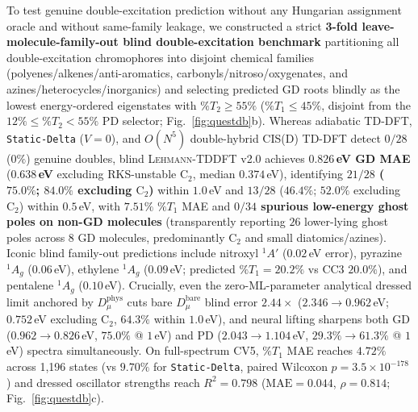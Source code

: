 \documentclass[10pt,twocolumn]{article}
\theoremstyle{natthm}
\newcommand{\leh}{\textsc{Lehmann-TDDFT}}
\newcommand{\pctT}{\mathrm{\%}T_1}
\begin{document}
To test genuine double-excitation prediction without any Hungarian assignment oracle\cite{kuhn1955hungarian} and without same-family leakage, we constructed a strict \textbf{3-fold leave-molecule-family-out blind double-excitation benchmark} partitioning all double-excitation chromophores into disjoint chemical families (polyenes/alkenes/anti-aromatics, carbonyls/nitroso/oxygenates, and azines/heterocycles/inorganics) and selecting predicted GD roots blindly as the lowest energy-ordered eigenstates with $\%T_2\ge 55\%$ ($\%T_1\le 45\%$, disjoint from the $12\%\le\%T_2<55\%$ PD selector; Fig.~\ref{fig:questdb}b).
Whereas adiabatic TD-DFT, \texttt{Static-Delta} ($V=0$), and $O(N^5)$ double-hybrid CIS(D) TD-DFT detect $0/28$ ($0\%$) genuine doubles, blind \leh{} v2.0 achieves \textbf{$0.826$\,eV GD MAE} (\textbf{$0.638$\,eV} excluding RKS-unstable $\mathrm{C}_2$, median $0.374$\,eV), identifying \textbf{$21/28$ ($75.0\%$; $84.0\%$ excluding $\mathrm{C}_2$)} within $1.0$\,eV and $13/28$ ($46.4\%$; $52.0\%$ excluding $\mathrm{C}_2$) within $0.5$\,eV, with $7.51\%$ $\pctT$ MAE and \textbf{$0/34$ spurious low-energy ghost poles on non-GD molecules} (transparently reporting $26$ lower-lying ghost poles across 8 GD molecules, predominantly $\mathrm{C}_2$ and small diatomics/azines).
Iconic blind family-out predictions include nitroxyl $^1A'$ ($0.02$\,eV error), pyrazine $^1A_g$ ($0.06$\,eV), ethylene $^1A_g$ ($0.09$\,eV; predicted $\pctT=20.2\%$ vs CC3 $20.0\%$), and pentalene $^1A_g$ ($0.10$\,eV).
Crucially, even the zero-ML-parameter analytical dressed limit anchored by $D_\mu^{\mathrm{phys}}$ cuts bare $D_\mu^{\mathrm{bare}}$ blind error $2.44\times$ ($2.346\to 0.962$\,eV; $0.752$\,eV excluding $\mathrm{C}_2$, $64.3\%$ within $1.0$\,eV), and neural lifting sharpens both GD ($0.962\to 0.826$\,eV, $75.0\%$ @ $1$\,eV) and PD ($2.043\to 1.104$\,eV, $29.3\%\to 61.3\%$ @ $1$\,eV) spectra simultaneously.
On full-spectrum CV5, $\pctT$ MAE reaches \textbf{$4.72\%$} across 1,196 states (vs $9.70\%$ for \texttt{Static-Delta}, paired Wilcoxon $p=3.5\times 10^{-178}$) and dressed oscillator strengths reach $R^2=0.798$ ($\mathrm{MAE}=0.044$, $\rho=0.814$; Fig.~\ref{fig:questdb}c).
\end{document}
